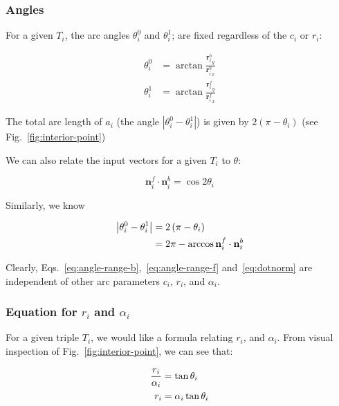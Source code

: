 \documentclass{article}
\begin{document}
\subsubsection{Angles}

For a given $T_i$, the arc angles $\theta^0_i$ and $\theta^{1}_{i}$; are fixed regardless of the $c_i$ or $r_{i}$:

\begin{align}
  \label{eq:angle-range-b}
  \theta^{0}_{i} &= \arctan \frac{{\mathbf{r}^{b}_{i}}_{y}}{{\mathbf{r}^{b}_{i}}_{x}}\\
  \label{eq:angle-range-f}
  \theta^{1}_{i} &= \arctan \frac{{\mathbf{r}^{f}_{i}}_{y}}{{\mathbf{r}^{f}_{i}}_{x}}
\end{align}

The total arc length of $a_i$ (the angle $\left|\theta^0_i -\theta^1_i\right|$) is given by $2\left(\pi-\theta_i\right)$ (see Fig.~\ref{fig:interior-point})

We can also relate the input vectors for a given $T_{i}$ to $\theta$:

\begin{equation}
  \label{eq:dotnorm}
  \mathbf{n}^{f}_{i} \cdot \mathbf{n}^{b}_{i} = \cos 2\theta_i
\end{equation}

Similarly, we know

\begin{align}
  \notag
  \left|\theta^0_i -\theta^1_i\right| &= 2\left(\pi-\theta_i\right)\\
  \label{eq:arclen-dot}
  &= 2\pi-\arccos \mathbf{n}^{f}_{i} \cdot \mathbf{n}^{b}_{i}
\end{align}

Clearly, Eqs.~\eqref{eq:angle-range-b},~\eqref{eq:angle-range-f} and~\eqref{eq:dotnorm} are independent of other arc parameters $c_{i}$, $r_{i}$, and $\alpha_i$.

\subsubsection{Equation for $r_i$ and $\alpha_{i}$}

For a given triple $T_{i}$, we would like a formula relating $r_{i}$, and $\alpha_{i}$.  From visual inspection of Fig.~\ref{fig:interior-point}, we can see that:

\begin{align}
  \notag
  \frac{r_i}{\alpha_{i}} &= \tan \theta_i\\
  \label{eq:tantheta}
  r_i &= \alpha_{i}\tan \theta_i
\end{align}
\end{document}
